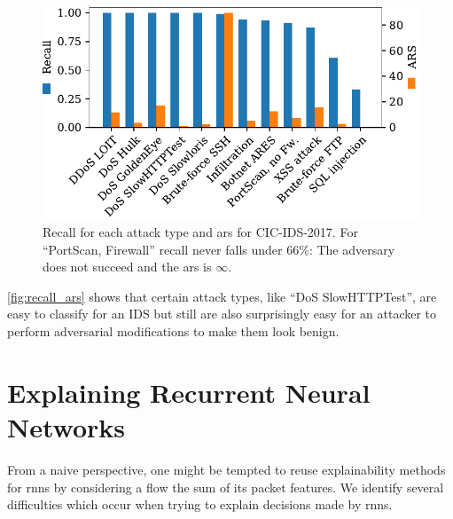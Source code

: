 \documentclass[conference]{IEEEtran}
\begin{document}
\begin{figure}[h]
\includegraphics[width=\columnwidth]{../plots/ars_original.pdf}
\caption{Recall for each attack type and \gls{ars} for CIC-IDS-2017. For ``PortScan, Firewall'' recall never falls under 66\%: The adversary does not succeed and the \gls{ars} is $\infty$.}
\label{fig:recall_ars}
\end{figure}

\autoref{fig:recall_ars} shows that certain attack types, like ``DoS SlowHTTPTest'', are easy to classify for an IDS but still are also surprisingly easy for an attacker to perform adversarial modifications to make them look benign.

\section{Explaining Recurrent Neural Networks}
From a naive perspective, one might be tempted to reuse explainability methods for \glspl{rnn} by considering a flow the sum of its packet features.
We identify several difficulties which occur when trying to explain decisions made by \glspl{rnn}.
\end{document}
